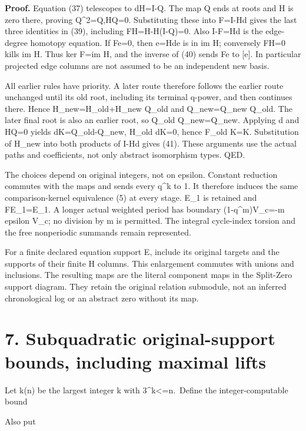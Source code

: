 \textbf{Proof.} Equation (37) telescopes to dH=I-Q. The map Q ends at
roots and H is zero there, proving Q\^{}2=Q,HQ=0. Substituting these
into F=I-Hd gives the last three identities in (39), including
FH=H-H(I-Q)=0. Also I-F=Hd is the edge-degree homotopy equation. If
Fe=0, then e=Hde is in im H; conversely FH=0 kills im H. Thus ker F=im
H, and the inverse of (40) sends Fe to {[}e{]}. In particular projected
edge columns are not assumed to be an independent new basis.

All earlier rules have priority. A later route therefore follows the
earlier route unchanged until its old root, including its terminal
q-power, and then continues there. Hence H\_new=H\_old+H\_new Q\_old and
Q\_new=Q\_new Q\_old. The later final root is also an earlier root, so
Q\_old Q\_new=Q\_new. Applying d and HQ=0 yields dK=Q\_old-Q\_new,
H\_old dK=0, hence F\_old K=K. Substitution of H\_new into both products
of I-Hd gives (41). These arguments use the actual paths and
coefficients, not only abstract isomorphism types. QED.

The choices depend on original integers, not on epsilon. Constant
reduction commutes with the maps and sends every q\^{}k to 1. It
therefore induces the same comparison-kernel equivalence (5) at every
stage. E\_1 is retained and FE\_1=E\_1. A longer actual weighted period
has boundary (1-q\^{}m)V\_c=-m epsilon V\_c; no division by m is
permitted. The integral cycle-index torsion and the free nonperiodic
summands remain represented.

For a finite declared equation support E, include its original targets
and the supports of their finite H columns. This enlargement commutes
with unions and inclusions. The resulting maps are the literal component
maps in the Split-Zero support diagram. They retain the original
relation submodule, not an inferred chronological log or an abstract
zero without its map.

\section{7. Subquadratic original-support bounds, including maximal
lifts}

Let k(n) be the largest integer k with 3\^{}k\textless=n.~Define the
integer-computable bound


Also put


